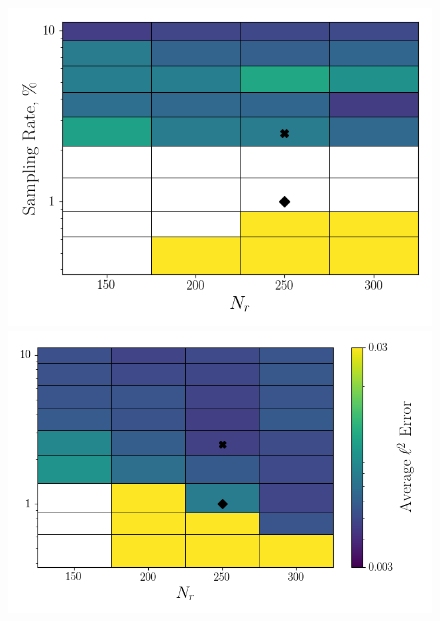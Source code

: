\begin{figure}
	\begin{minipage}{0.46\linewidth}
		\includegraphics[width=0.99\linewidth]{Chapters/CavityAndCVRC/Images/cavity/deim/err_contour_random_dt5e-6.png}
	\end{minipage}
	\begin{minipage}{0.53\linewidth}
		\includegraphics[width=0.99\linewidth]{Chapters/CavityAndCVRC/Images/cavity/deim/err_contour_eigenvec_dt5e-6.png}
	\end{minipage}


\end{figure}

